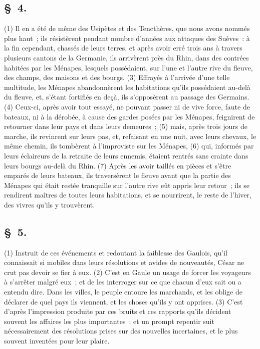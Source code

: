 \documentclass[french,twoside]{book} %
\begin{document}
\subsection[{§ 4.}]{ \textsc{§ 4.} }
\noindent (1) Il en a été de même des Usipètes et des Tencthères, que nous avons nommés plus haut ; ils résistèrent pendant nombre d’années aux attaques des Suèves : à la fin cependant, chassés de leurs terres, et après avoir erré trois ans à travers plusieurs cantons de la Germanie, ils arrivèrent près du Rhin, dans des contrées habitées par les Ménapes, lesquels possédaient, sur l’une et l’autre rive du fleuve, des champs, des maisons et des bourgs. (3) Effrayés à l’arrivée d’une telle multitude, les Ménapes abandonnèrent les habitations qu’ils possédaient au-delà du fleuve, et, s’étant fortifiés en deçà, ils s’opposèrent au passage des Germains. (4) Ceux-ci, après avoir tout essayé, ne pouvant passer ni de vive force, faute de bateaux, ni à la dérobée, à cause des gardes posées par les Ménapes, feignirent de retourner dans leur pays et dans leurs demeures ; (5) mais, après trois jours de marche, ils revinrent sur leurs pas, et, refaisant en une nuit, avec leurs chevaux, le même chemin, ils tombèrent à l’improviste sur les Ménapes, (6) qui, informés par leurs éclaireurs de la retraite de leurs ennemis, étaient rentrés sans crainte dans leurs bourgs au-delà du Rhin. (7) Après les avoir taillés en pièces et s’être emparés de leurs bateaux, ils traversèrent le fleuve avant que la partie des Ménapes qui était restée tranquille sur l’autre rive eût appris leur retour ; ils se rendirent maîtres de toutes leurs habitations, et se nourrirent, le reste de l’hiver, des vivres qu’ils y trouvèrent.
\subsection[{§ 5.}]{ \textsc{§ 5.} }
\noindent (1) Instruit de ces événements et redoutant la faiblesse des Gaulois, qu’il connaissait si mobiles dans leurs résolutions et avides de nouveautés, César ne crut pas devoir se fier à eux. (2) C'est en Gaule un usage de forcer les voyageurs à s’arrêter malgré eux ; et de les interroger sur ce que chacun d’eux sait ou a entendu dire. Dans les villes, le peuple entoure les marchands, et les oblige de déclarer de quel pays ils viennent, et les choses qu’ils y ont apprises. (3) C'est d’après l’impression produite par ces bruits et ces rapports qu’ils décident souvent les affaires les plus importantes ; et un prompt repentir suit nécessairement des résolutions prises sur des nouvelles incertaines, et le plus souvent inventées pour leur plaire.
\end{document}
